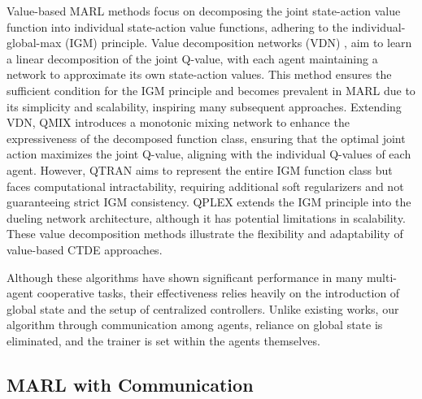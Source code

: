 Value-based MARL methods focus on decomposing the joint state-action value function into individual state-action value functions, adhering to the individual-global-max (IGM) principle. Value decomposition networks (VDN) \cite{sunehag2017value}, aim to learn a linear decomposition of the joint Q-value, with each agent maintaining a network to approximate its own state-action values. This method ensures the sufficient condition for the IGM principle and becomes prevalent in MARL due to its simplicity and scalability, inspiring many subsequent approaches. Extending VDN, QMIX \cite{rashid2020monotonic} introduces a monotonic mixing network to enhance the expressiveness of the decomposed function class, ensuring that the optimal joint action maximizes the joint Q-value, aligning with the individual Q-values of each agent. However, QTRAN \cite{son2019qtran} aims to represent the entire IGM function class but faces computational intractability, requiring additional soft regularizers and not guaranteeing strict IGM consistency. QPLEX \cite{wang2020qplex} extends the IGM principle into the dueling network architecture, although it has potential limitations in scalability. These value decomposition methods illustrate the flexibility and adaptability of value-based CTDE approaches.

Although these algorithms have shown significant performance in many multi-agent cooperative tasks, their effectiveness relies heavily on the introduction of global state and the setup of centralized controllers. Unlike existing works, our algorithm through communication among agents, reliance on global state is eliminated, and the trainer is set within the agents themselves.


\subsection{MARL with Communication}

